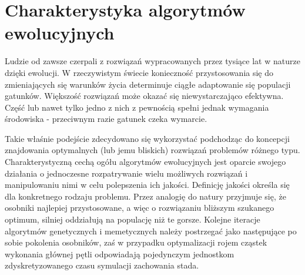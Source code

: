 \chapter{Charakterystyka algorytmów ewolucyjnych}
\label{ch:charakterystyka_algorytmow_ewolucyjnych}
\par
Ludzie od zawsze czerpali z rozwiązań wypracowanych przez tysiące lat w naturze dzięki ewolucji. W rzeczywistym świecie konieczność przystosowania się do zmieniających się warunków życia determinuje ciągłe adaptowanie się populacji gatunków. Większość rozwiązań może okazać się niewystarczająco efektywna. Część lub nawet tylko jedno z nich z pewnością spełni jednak wymagania środowiska - przeciwnym razie gatunek czeka wymarcie. 
\par
Takie właśnie podejście zdecydowano się wykorzystać podchodząc do koncepcji znajdowania optymalnych (lub jemu bliskich) rozwiązań problemów różnego typu. Charakterystyczną cechą ogółu algorytmów ewolucyjnych jest oparcie swojego działania o jednoczesne rozpatrywanie wielu możliwych rozwiązań i manipulowaniu nimi w celu polepszenia ich jakości. Definicję jakości określa się dla konkretnego rodzaju problemu. Przez analogię do natury przyjmuje się, że osobniki najlepiej przystosowane, a więc o rozwiązaniu bliższym szukanego optimum, silniej oddziałują na populację niż te gorsze. Kolejne iteracje algorytmów genetycznych i memetycznych należy postrzegać jako następujące po sobie pokolenia osobników, zaś w przypadku optymalizacji rojem cząstek wykonania głównej pętli odpowiadają pojedynczym jednostkom zdyskretyzowanego czasu symulacji zachowania stada. 
